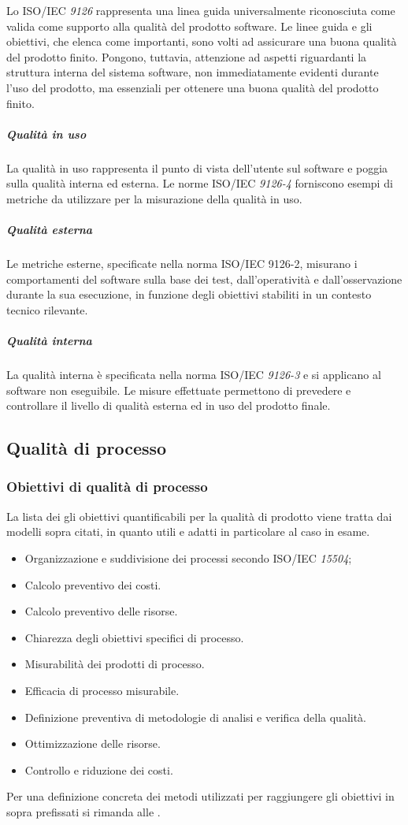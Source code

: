 \documentclass[12pt,a4paper]{article}
\begin{document}
Lo ISO/IEC \textit{9126} rappresenta una linea guida universalmente riconosciuta come valida come supporto alla qualità del prodotto software. Le linee guida e gli obiettivi, che elenca come importanti, sono volti ad assicurare una buona qualità del prodotto finito. Pongono, tuttavia, attenzione ad aspetti riguardanti la struttura interna del sistema software, non immediatamente evidenti durante l'uso del prodotto, ma essenziali per ottenere una buona qualità del prodotto finito.
\subparagraph{Qualità in uso}
La qualità in uso rappresenta il punto di vista dell'utente sul software e poggia sulla qualità interna ed esterna. Le norme ISO/IEC \textit{9126-4} forniscono esempi di metriche da utilizzare per la misurazione della qualità in uso.
\subparagraph{Qualità esterna}
Le metriche esterne, specificate nella norma ISO/IEC 9126-2, misurano i comportamenti del software sulla base dei test, dall'operatività e dall'osservazione durante la sua esecuzione, in funzione degli obiettivi stabiliti in un contesto tecnico rilevante.
\subparagraph{Qualità interna}
La qualità interna è specificata nella norma ISO/IEC \textit{9126-3} e si applicano al software non eseguibile. Le misure effettuate permettono di prevedere e controllare il livello di qualità esterna ed in uso del prodotto finale.



\subsection{Qualità di processo}


\subsubsection{Obiettivi di qualità di processo}
La lista dei gli obiettivi quantificabili per la qualità di prodotto viene tratta dai modelli sopra citati, in quanto utili e adatti in particolare al caso in esame.
\begin{itemize}
	\item Organizzazione e suddivisione dei processi secondo ISO/IEC \textit{15504};
	\item Calcolo preventivo dei costi.
	\item Calcolo preventivo delle risorse.
	\item Chiarezza degli obiettivi specifici di processo.
	\item Misurabilità dei prodotti di processo.
	\item Efficacia di processo misurabile.
	\item Definizione preventiva di metodologie di analisi e verifica della qualità.
	\item{Ottimizzazione delle risorse}.
	\item{Controllo e riduzione dei costi}.
\end{itemize}
Per una definizione concreta dei metodi utilizzati per raggiungere gli obiettivi in sopra prefissati si rimanda alle \NdP{}.
\end{document}

